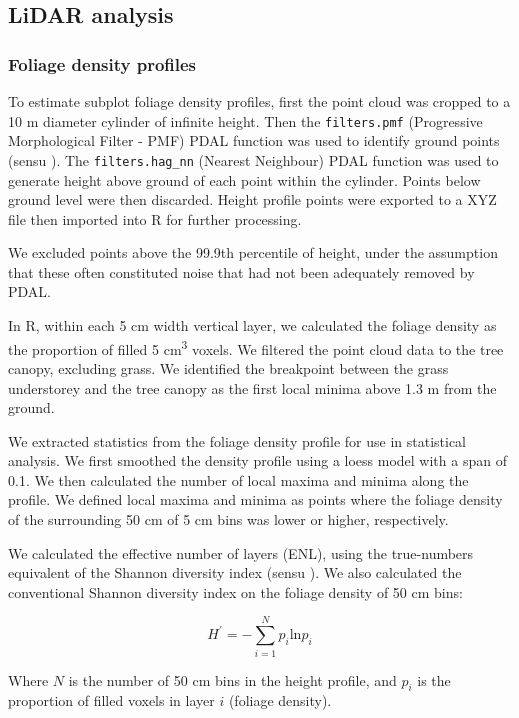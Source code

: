 \documentclass[11pt,a4paper]{article}
\begin{document}
\subsection{LiDAR analysis}

\subsubsection{Foliage density profiles}

To estimate subplot foliage density profiles, first the point cloud was cropped to a 10 m diameter cylinder of infinite height. Then the \texttt{filters.pmf} (Progressive Morphological Filter - PMF) PDAL function was used to identify ground points (sensu \citealt{Zhang2003}). The \texttt{filters.hag\_nn} (Nearest Neighbour) PDAL function was used to generate height above ground of each point within the cylinder. Points below ground level were then discarded. Height profile points were exported to a XYZ file then imported into R for further processing. 

We excluded points above the 99.9th percentile of height, under the assumption that these often constituted noise that had not been adequately removed by PDAL.

In R, within each 5 cm width vertical layer, we calculated the foliage density as the proportion of filled 5 cm\textsuperscript{3} voxels. We filtered the point cloud data to the tree canopy, excluding grass. We identified the breakpoint between the grass understorey and the tree canopy as the first local minima above 1.3 m from the ground. 

We extracted statistics from the foliage density profile for use in statistical analysis. We first smoothed the density profile using a loess model with a span of 0.1. We then calculated the number of local maxima and minima along the profile. We defined local maxima and minima as points where the foliage density of the surrounding 50 cm of 5 cm bins was lower or higher, respectively.

We calculated the effective number of layers (ENL), using the true-numbers equivalent of the Shannon diversity index (sensu \citep{Ehbrecht2016}). We also calculated the conventional Shannon diversity index on the foliage density of 50 cm bins:

\begin{equation}
	H^{\prime{}} = - \sum_{i=1}^{N} p_{i} \text{ln} p_{i}
\end{equation}

Where $N$ is the number of 50 cm bins in the height profile, and $p_{i}$ is the proportion of filled voxels in layer $i$ (foliage density).
\end{document}

